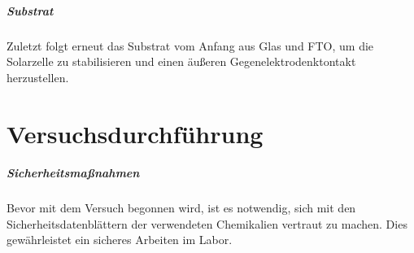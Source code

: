 \documentclass[12pt,a4paper,ngerman]{report}
\begin{document}
	\paragraph{Substrat}
	Zuletzt folgt erneut das Substrat vom Anfang aus Glas und FTO, um die Solarzelle zu stabilisieren und einen äußeren Gegenelektrodenktontakt herzustellen.
	
		



	

\chapter{Versuchsdurchführung}
	\paragraph*{Sicherheitsmaßnahmen}
	Bevor mit dem Versuch begonnen wird, ist es notwendig, sich mit den Sicherheitsdatenblättern der verwendeten Chemikalien vertraut zu machen. Dies gewährleistet ein sicheres Arbeiten im Labor.
\end{document}
